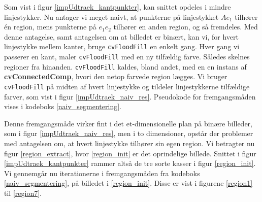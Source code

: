 {Som vist i figur \ref{impUdtraek_kantpunkter}, kan snittet opdeles i
mindre linjestykker. Nu antager vi meget naivt, at punkterne på
linjestykket $Ae_1$ tilhører én region, mens punkterne på $e_1e_2$
tilhører en anden region, og så fremdeles. Med denne antagelse, samt
antagelsen om at billedet er binært, kan vi, for hvert linjestykke
mellem kanter, bruge \texttt{cvFloodFill} en enkelt gang. Hver gang vi
passerer en kant, maler \texttt{cvFloodFill} med en ny tilfældig farve.
Således skelnes regioner fra hinanden. \texttt{cvFloodFill} kaldes,
bland andet, med en en instans af \textbf{cvConnectedComp}, hvori den
netop farvede region lægges. Vi bruger \texttt{cvFloodFill} på midten af
hvert linjestykke og tildeler linjestykkerne tilfældige farver, som vist
i figur \ref{impUdtraek_naiv_res}. Pseudokode for fremgangsmåden vises i
kodeboks \ref{naiv_segmentering}.

Denne fremgangsmåde virker fint i det et-dimensionelle plan på binære
billeder, som i figur \ref{impUdtraek_naiv_res}, men i to dimensioner,
opstår der problemer med antagelsen om, at hvert linjestykke tilhører
sin egen region. Vi betragter nu figur \ref{region_extract}, hvor
\ref{region_init} er det oprindelige billede.  Snittet i figur
\ref{impUdtraek_kantpunkter} rammer altså de tre sorte kasser i figur
\ref{region_init}. Vi gennemgår nu iterationerne i fremgangsmåden fra
kodeboks \ref{naiv_segmentering}, på billedet i \ref{region_init}.
Disse er vist i figurene \ref{region1} til \ref{region7}.
\clearpage

}
